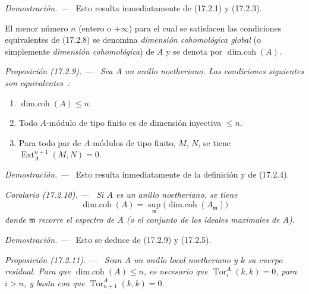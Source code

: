 \documentclass[10pt,oneside]{book}
\makeatletter
\newcommand{\setmanualcurrentlabel}[1]{\def\@currentlabel{#1}}
\newcommand{\oldpage}[2][]{%
  \setcounter{footnote}{0}%
  \marginpar{\scriptsize\textbf{#1}~|~#2}\ignorespaces}
\newenvironment{proposition}[1][]{%
  \setmanualcurrentlabel{#1}\par\medskip\noindent\itshape Proposición (#1). ---\ }{\par}
\newenvironment{corollary}[1][]{%
  \setmanualcurrentlabel{#1}\par\medskip\noindent\itshape Corolario (#1). ---\ }{\par}
\newenvironment{proof}{%
  \par\medskip\noindent\textit{Demostración. ---\ }}{\par}
\makeatother
\begin{document}
\begin{proof}
\oldpage[0\textsubscript{IV-1}]{45}
Esto resulta inmediatamente de (17.2.1) y (17.2.3).
\end{proof}

El menor número $n$ (entero o $+\infty$) para el cual se satisfacen las condiciones
equivalentes de (17.2.8) se denomina \emph{dimensión cohomológica
global} (o simplemente \emph{dimensión cohomológica}) de $A$
y se denota por $\operatorname{dim.coh}(A)$.

\begin{proposition}[17.2.9]
\label{0.17.2.9-es}
Sea $A$ un anillo noetheriano. Las condiciones siguientes son equivalentes~:
\begin{enumerate}
  \item[\rm a)] $\operatorname{dim.coh}(A)\leq n$.
  \item[\rm b)] Todo $A$-módulo de tipo finito es de dimensión inyectiva
  $\leq n$.
  \item[\rm c)] Para todo par de $A$-módulos de tipo finito, $M$, $N$, se tiene
  $\operatorname{Ext}^{n+1}_A(M,N)=0$.
\end{enumerate}
\end{proposition}

\begin{proof}
Esto resulta inmediatamente de la definición y de (17.2.4).
\end{proof}

\begin{corollary}[17.2.10]
\label{0.17.2.10-es}
Si $A$ es un anillo noetheriano, se tiene
\begin{equation}
\label{0.17.2.10.1-es}
\tag{17.2.10.1}
  \operatorname{dim.coh}(A)
  =\sup_{\mathfrak{m}}
  \bigl(\operatorname{dim.coh}(A_{\mathfrak{m}})\bigr)
\end{equation}
donde $\mathfrak{m}$ recorre el espectro de $A$ \textup{(}o el conjunto de los ideales
maximales de $A$\textup{)}.
\end{corollary}

\begin{proof}
Esto se deduce de (17.2.9) y (17.2.5).
\end{proof}

\begin{proposition}[17.2.11]
\label{0.17.2.11-es}
Sean $A$ un anillo local noetheriano y $k$ su cuerpo residual. Para que
$\operatorname{dim.coh}(A)\leq n$, es necesario que
$\operatorname{Tor}^A_i(k,k)=0$, para $i>n$, y basta con que
$\operatorname{Tor}^A_{n+1}(k,k)=0$.
\end{proposition}
\end{document}
